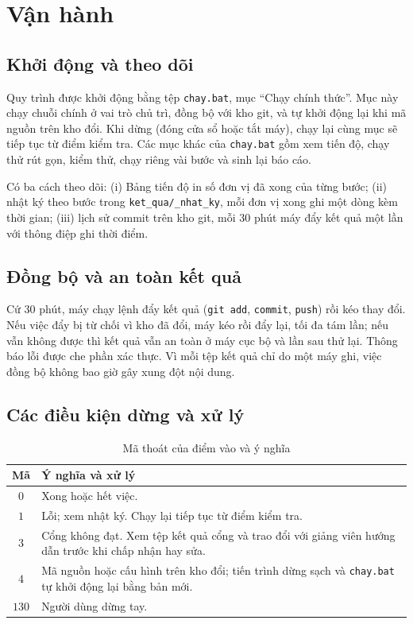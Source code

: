 \documentclass[12pt,a4paper]{article}
\theoremstyle{remark}
\newcommand{\ma}[1]{\texttt{\small #1}}
\begin{document}
\section{Vận hành}

\subsection{Khởi động và theo dõi}

Quy trình được khởi động bằng tệp \ma{chay.bat}, mục ``Chạy chính thức''. Mục này chạy chuỗi chính ở vai trò chủ trì, đồng bộ với kho git, và tự khởi động lại khi mã nguồn trên kho đổi. Khi dừng (đóng cửa sổ hoặc tắt máy), chạy lại cùng mục sẽ tiếp tục từ điểm kiểm tra. Các mục khác của \ma{chay.bat} gồm xem tiến độ, chạy thử rút gọn, kiểm thử, chạy riêng vài bước và sinh lại báo cáo.

Có ba cách theo dõi: (i) Bảng tiến độ in số đơn vị đã xong của từng bước; (ii) nhật ký theo bước trong \ma{ket\_qua/\_nhat\_ky}, mỗi đơn vị xong ghi một dòng kèm thời gian; (iii) lịch sử commit trên kho git, mỗi $30$ phút máy đẩy kết quả một lần với thông điệp ghi thời điểm.

\subsection{Đồng bộ và an toàn kết quả}

Cứ $30$ phút, máy chạy lệnh đẩy kết quả (\ma{git add}, \ma{commit}, \ma{push}) rồi kéo thay đổi. Nếu việc đẩy bị từ chối vì kho đã đổi, máy kéo rồi đẩy lại, tối đa tám lần; nếu vẫn không được thì kết quả vẫn an toàn ở máy cục bộ và lần sau thử lại. Thông báo lỗi được che phần xác thực. Vì mỗi tệp kết quả chỉ do một máy ghi, việc đồng bộ không bao giờ gây xung đột nội dung.

\subsection{Các điều kiện dừng và xử lý}

\begin{table}[h]
\centering
\caption{Mã thoát của điểm vào và ý nghĩa}\label{tab:mathoat}
\begin{tabular}{@{}cp{11.2cm}@{}}
\toprule
\textbf{Mã} & \textbf{Ý nghĩa và xử lý} \\
\midrule
$0$ & Xong hoặc hết việc. \\
$1$ & Lỗi; xem nhật ký. Chạy lại tiếp tục từ điểm kiểm tra. \\
$3$ & Cổng không đạt. Xem tệp kết quả cổng và trao đổi với giảng viên hướng dẫn trước khi chấp nhận hay sửa. \\
$4$ & Mã nguồn hoặc cấu hình trên kho đổi; tiến trình dừng sạch và \ma{chay.bat} tự khởi động lại bằng bản mới. \\
$130$ & Người dùng dừng tay. \\
\bottomrule
\end{tabular}
\end{table}
\end{document}
